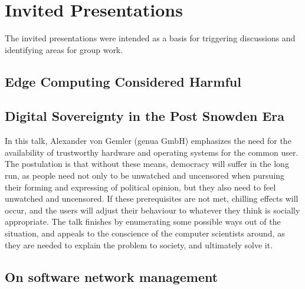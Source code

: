 \section{Invited Presentations}\label{sec:invited-presentations}

The invited presentations were intended as a basis for triggering discussions
and identifying areas for group work.

\subsection{Edge Computing Considered Harmful}


\subsection{Digital Sovereignty in the Post Snowden Era}

In this talk, Alexander von Gemler (genua GmbH) emphasizes the need for the
availability of trustworthy hardware and operating systems for the common
user.  The postulation is that without these means, democracy will suffer in
the long run, as people need not only to be unwatched and uncensored when
pursuing their forming and expressing of political opinion, but they also need
to feel unwatched and uncensored.  If these prerequisites are not met,
chilling effects will occur, and the users will adjust their behaviour to
whatever they think is socially appropriate.  The talk finishes by enumerating
some possible ways out of the situation, and appeals to the conscience of the
computer scientists around, as they are needed to explain the problem to
society, and ultimately solve it.

\subsection{On software network management}

